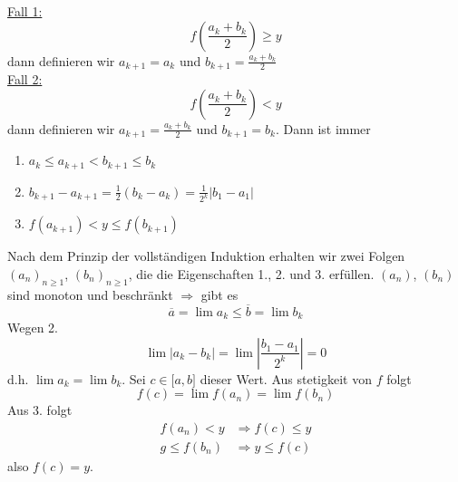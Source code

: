 \begin{beweis}{}
\noindent\underline{Fall 1:}
\[f\left( {\frac{{{a_k} + {b_k}}}{2}} \right) \ge y\] dann definieren wir $a_{k+1}=a_k$ und $b_{k+1}=\frac{a_k+b_k}{2}$\\

\noindent\underline{Fall 2:}
\[f\left( {\frac{{{a_k} + {b_k}}}{2}} \right) < y\]
dann definieren wir $a_{k+1}=\frac{a_k+b_k}{2}$ und $b_{k+1}=b_k$. Dann ist immer
\begin{enumerate}
\item $a_k\leq a_{k+1}<b_{k+1}\leq b_k$
\item ${b_{k + 1}} - {a_{k + 1}} = \frac{1}{2}\left( {{b_k} - {a_k}} \right) = \frac{1}{{{2^k}}}\left| {{b_1} - {a_1}} \right|$
\item $f\left( a_{k+1}\right) < y \leq f\left( b_{k+1}\right)$
\end{enumerate}
Nach dem Prinzip der vollständigen Induktion erhalten wir zwei Folgen $\left( a_n\right)_{n\geq 1}$, $\left( b_n\right)_{n\geq 1}$, die die Eigenschaften 1., 2. und 3. erfüllen. $\left( a_n\right)$, $\left( b_n\right)$ sind monoton und beschränkt $\Rightarrow$ gibt es
\[\overline{a}=\lim a_k\leq\overline{b}=\lim b_k \]
Wegen 2.
\[\lim \left| {{a_k} - {b_k}} \right| = \lim \left| {\frac{{{b_1} - {a_1}}}{{{2^k}}}} \right| = 0\]
d.h. $\lim a_k=\lim b_k$. Sei $c\in\lbrack a,b\rbrack$ dieser Wert. Aus stetigkeit von $f$ folgt
\[f\left( c \right) = \lim f\left( {{a_n}} \right) = \lim f\left( {{b_n}} \right)\]
Aus 3. folgt
\begin{align*}
f\left( {{a_n}} \right) < y &\Rightarrow f\left( c \right) \le y\\
g \le f\left( {{b_n}} \right) &\Rightarrow y \le f\left( c \right)
\end{align*}
also $f(c)=y$.
\end{beweis}


